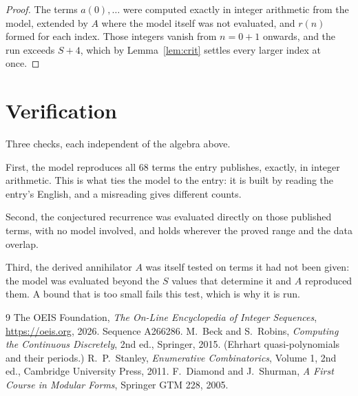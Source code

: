 \documentclass[11pt,a4paper]{article}
\theoremstyle{plain}
\theoremstyle{definition}
\begin{document}
\begin{proof}
The terms $a(0),\dots$ were computed exactly in integer arithmetic from the model, extended by
$A$ where the model itself was not evaluated, and $r(n)$ formed for each index. Those integers
vanish from $n=0+1$ onwards, and the run exceeds $S+4$, which by
Lemma~\ref{lem:crit} settles every larger index at once.
\end{proof}

\section{Verification}

Three checks, each independent of the algebra above.

First, the model reproduces all $68$ terms the entry publishes, exactly, in integer
arithmetic. This is what ties the model to the entry: it is built by reading the entry's
English, and a misreading gives different counts.

Second, the conjectured recurrence was evaluated directly on those published terms, with no
model involved, and holds wherever the proved range and the data overlap.

Third, the derived annihilator $A$ was itself tested on terms it had not been given: the model
was evaluated beyond the $S$ values that determine it and $A$ reproduced them. A bound that is
too small fails this test, which is why it is run.

\begin{thebibliography}{9}
 The OEIS Foundation, \emph{The On-Line Encyclopedia of Integer
Sequences}, \url{https://oeis.org}, 2026. Sequence A266286.
 M.~Beck and S.~Robins, \emph{Computing the Continuous Discretely},
2nd ed., Springer, 2015. (Ehrhart quasi-polynomials and their periods.)
 R.~P.~Stanley, \emph{Enumerative Combinatorics}, Volume 1, 2nd ed.,
Cambridge University Press, 2011.
 F.~Diamond and J.~Shurman, \emph{A First Course in Modular Forms},
Springer GTM 228, 2005.
\end{thebibliography}
\end{document}
